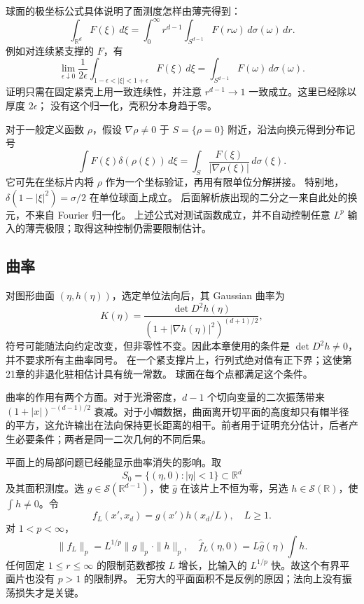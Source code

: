 \ProseParagraphBreak
球面的极坐标公式具体说明了面测度怎样由薄壳得到：
\[
 \int_{\mathbb R^d}F(\xi)\,d\xi
 =\int_0^\infty r^{d-1}
       \int_{S^{d-1}}F(r\omega)\,d\sigma(\omega)\,dr.
\]
例如对连续紧支撑的 \(F\)，有
\[
 \lim_{\epsilon\downarrow0}
 \frac1{2\epsilon}\int_{1-\epsilon<|\xi|<1+\epsilon}F(\xi)\,d\xi
 =\int_{S^{d-1}}F(\omega)\,d\sigma(\omega).
\]
证明只需在固定紧壳上用一致连续性，并注意
\(r^{d-1}\to1\) 一致成立。这里已经除以厚度 \(2\epsilon\)；
没有这个归一化，壳积分本身趋于零。

\ProseParagraphBreak
对于一般定义函数 \(\rho\)，假设 \(\nabla\rho\neq0\) 于
\(S=\{\rho=0\}\) 附近，沿法向换元得到分布记号
\[
 \int F(\xi)\delta(\rho(\xi))\,d\xi
 =\int_S\frac{F(\xi)}{|\nabla\rho(\xi)|}\,d\sigma(\xi).
\]
它可先在坐标片内将 \(\rho\) 作为一个坐标验证，再用有限单位分解拼接。
特别地，
\(\delta(1-|\xi|^2)=\sigma/2\) 在单位球面上成立。
后面解析族出现的二分之一来自此处的换元，不来自 Fourier 归一化。
上述公式对测试函数成立，并不自动控制任意 \(L^p\) 输入的薄壳极限；取得这种控制仍需要限制估计。

\subsection{曲率}
\label{b2:subsec:230103}

对图形曲面 \((\eta,h(\eta))\)，选定单位法向后，其 Gaussian 曲率为
\[
 K(\eta)=\frac{\det D^2h(\eta)}
                 {(1+|\nabla h(\eta)|^2)^{(d+1)/2}},
\]
符号可能随法向约定改变，但非零性不变。因此本章使用的条件是
\(\det D^2h\neq0\)，并不要求所有主曲率同号。
在一个紧支撑片上，行列式绝对值有正下界；这使第21章的非退化驻相估计具有统一常数。
球面在每个点都满足这个条件。

\ProseParagraphBreak
曲率的作用有两个方面。对于光滑密度，\(d-1\) 个切向变量的二次振荡带来
\((1+|x|)^{-(d-1)/2}\) 衰减。对于小帽数据，曲面离开切平面的高度却只有帽半径的平方，这允许输出在法向保持更长距离的相干。前者用于证明充分估计，后者产生必要条件；两者是同一二次几何的不同后果。

\ProseParagraphBreak
平面上的局部问题已经能显示曲率消失的影响。取
\[
 S_0=\{(\eta,0):|\eta|<1\}\subset\mathbb R^d
\]
及其面积测度。选 \(g\in\mathcal S(\mathbb R^{d-1})\)，使
\(\widehat g\) 在该片上不恒为零，另选 \(h\in\mathcal S(\mathbb R)\)，使
\(\int h\neq0\)。令
\[
 f_L(x',x_d)=g(x')h(x_d/L),\quad L\geq1.
\]
对 \(1<p<\infty\)，
\[
 \|f_L\|_p=L^{1/p}\|g\|_p\cdot\|h\|_p,\quad
 \widehat f_L(\eta,0)=L\widehat g(\eta)\int h.
\]
任何固定 \(1\leq r\leq\infty\) 的限制范数都按 \(L\) 增长，比输入的
\(L^{1/p}\) 快。故这个有界平面片也没有 \(p>1\) 的限制界。
无穷大的平面面积不是反例的原因；法向上没有振荡损失才是关键。

